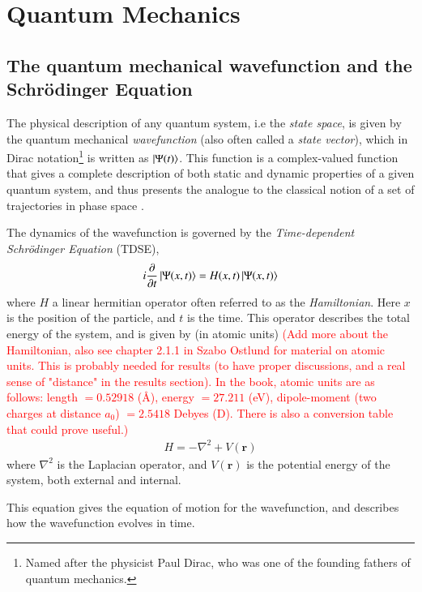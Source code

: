 \documentclass{subfiles}
\begin{document}
\section{Quantum Mechanics}
\subsection*{The quantum mechanical wavefunction and the Schrödinger Equation}
The physical description of any quantum system, i.e the \emph{state space}, is given by the quantum mechanical \emph{wavefunction} (also often called a \emph{state vector})\cite{nielsen2010quantum}, which in Dirac notation\footnote{Named after the physicist Paul Dirac, who was one of the founding fathers of quantum mechanics.} is written as $\ket{\Psi(t)}$. 
This function is a complex-valued function that gives a complete description of both static and dynamic properties of a given quantum system, and thus presents the analogue to the classical notion of a set of trajectories in phase space \cite{hochstuhl2014time}. 

The dynamics of the wavefunction is governed by the \emph{Time-dependent Schrödinger Equation} (TDSE),
\begin{equation}
    i\frac{\partial}{\partial t}\ket{\Psi(x, t)} = H(x,t)\ket{\Psi(x, t)}\label{eq:_tdse}
\end{equation}
where $H$ a linear hermitian operator often referred to as the \emph{Hamiltonian}. Here $x$ is the position of the particle, and $t$ is the time. 
This operator describes the total energy of the system, and is given by (in atomic units) \textcolor{red}{(Add more about the Hamiltonian, also see chapter 2.1.1 in Szabo Ostlund for material on atomic units. This is probably needed for results (to have proper discussions, and a real sense of "distance" in the results section). In the book, atomic units are as follows: length $=0.52918$ (Å), energy $=27.211$ (eV), dipole-moment (two charges at distance $a_0$) $=2.5418$ Debyes (D). There is also a conversion table that could prove useful.)}
\begin{align*}
    H = -\nabla^2 + V(\mathbf{r})
\end{align*}
where $\nabla^2$ is the Laplacian operator, and $V(\mathbf{r})$ is the potential energy of the system, both external and internal.


This equation gives the equation of motion for the wavefunction, and describes how the wavefunction evolves in time.
\end{document}
